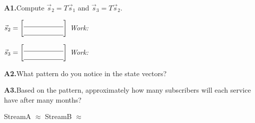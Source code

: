 \documentclass[10pt]{article}
\begin{document}
\vspace{0.08in}

\begin{tcolorbox}[colback=goldbg, colframe=goldacc,
    title=\textbf{Tier A --- Apply},
    fonttitle=\bfseries, arc=2mm, left=3mm, right=3mm, top=2mm, bottom=2mm]

\textbf{A1.}\quad Compute $\vec{s}_2 = T\vec{s}_1$ and $\vec{s}_3 = T\vec{s}_2$.

\vspace{6pt}
$\vec{s}_2 = \begin{bmatrix}\blank{2cm} \\ \blank{2cm}\end{bmatrix}$
\hfill \textit{Work:} \blank{7cm}

\vspace{6pt}
$\vec{s}_3 = \begin{bmatrix}\blank{2cm} \\ \blank{2cm}\end{bmatrix}$
\hfill \textit{Work:} \blank{7cm}

\vspace{10pt}
\textbf{A2.}\quad What pattern do you notice in the state vectors?

\writeline

\vspace{6pt}
\textbf{A3.}\quad Based on the pattern, approximately how many subscribers will each service have after many months?

\vspace{4pt}
StreamA $\approx$ \blank{3cm} \qquad StreamB $\approx$ \blank{3cm}

\end{tcolorbox}

\vspace{0.08in}
\end{document}
